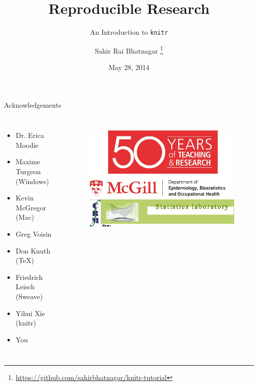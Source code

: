 \documentclass[10pt]{beamer}\usepackage[]{graphicx}\usepackage[]{color}
\begin{document}
\title[RR: Intro to \texttt{knitr}]{Reproducible Research}
\subtitle{An Introduction to \texttt{knitr}}

\author[]{Sahir Rai Bhatnagar%
\thanks{\href{https://github.com/sahirbhatnagar/knitr-tutorial}{https://github.com/sahirbhatnagar/knitr-tutorial}%
}}

\date{May 28, 2014}


\maketitle

\begin{frame}{Acknowledgements}
\begin{columns}[c] %


\begin{itemize}
\item Dr. Erica Moodie
\item Maxime Turgeon (Windows)
\item Kevin McGregor (Mac)
\item Greg Voisin
\item Don Knuth (\TeX)
\item Friedrich Leisch (Sweave)
\item Yihui Xie (knitr)
\item You
\end{itemize}

\begin{figure}
\includegraphics[width=0.6\columnwidth]{eboh50.pdf}\\[5mm]
\includegraphics[width=1.0\columnwidth]{crm.png}
\end{figure}

\end{columns}
\end{frame}
\end{document}
